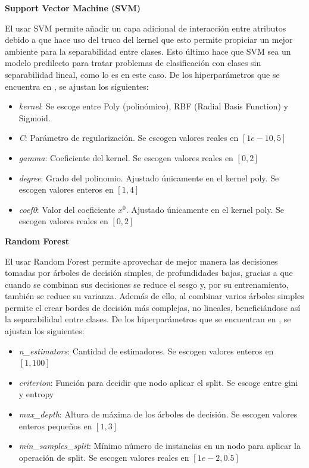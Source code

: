 \documentclass[12pt,a4paper]{article}
\begin{document}
{{            \textbf{Support Vector Machine (SVM)}\\
            {
                El usar SVM permite añadir un capa adicional de interacción entre atributos debido a 
                que hace uso del truco del kernel que esto permite propiciar un mejor ambiente para 
                la separabilidad entre clases. Esto último hace que SVM sea un modelo predilecto para 
                tratar problemas de clasificación con clases sin separabilidad lineal, como lo es en 
                este caso. De los hiperparámetros que se encuentra en \cite{sklearn_svc}, se ajustan 
                los siguientes:
                \begin{itemize}
                    \item \emph{kernel}: Se escoge entre Poly (polinómico), RBF (Radial Basis 
                    Function) y Sigmoid.
                    \item \emph{C}: Parámetro de regularización. Se escogen valores reales en $[1e-10,5]$
                    \item \emph{gamma}: Coeficiente del kernel. Se escogen valores reales en $[0,2]$
                    \item \emph{degree}: Grado del polinomio. Ajustado únicamente en el kernel poly. Se escogen valores enteros en $[1,4]$ 
                    \item \emph{coef0}: Valor del coeficiente $x^0$. Ajustado únicamente en el kernel poly. Se escogen valores reales en $[0,2]$
                \end{itemize}
            }

            \textbf{Random Forest}\\
            {
                El usar Random Forest permite aprovechar de mejor manera las decisiones tomadas 
                por árboles de decisión simples, de profundidades bajas, gracias a que cuando 
                se combinan sus decisiones se reduce el sesgo y, por su entrenamiento, también 
                se reduce su varianza. Además de ello, al combinar varios árboles simples permite 
                el crear bordes de decisión más complejas, no lineales, beneficiándose así la 
                separabilidad entre clases. De los hiperparámetros que se encuentran en \cite{sklearn_forest}, 
                se ajustan los siguientes:
                \begin{itemize}
                    \item \emph{n\_estimators}: Cantidad de estimadores. Se escogen valores enteros en $[1,100]$ 
                    \item \emph{criterion}: Función para decidir que nodo aplicar el split. Se escoge entre gini y entropy
                    \item \emph{max\_depth}: Altura de máxima de los árboles de decisión. Se escogen valores enteros pequeños en $[1,3]$
                    \item \emph{min\_samples\_split}: Mínimo número de instancias en un nodo para aplicar la operación de split. Se escogen valores reales en $[1e-2,0.5]$
                \end{itemize}
            }

}}
\end{document}
